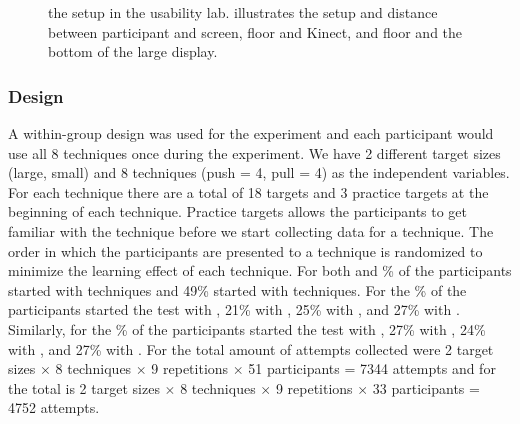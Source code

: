 \begin{figure}[H]
\caption{\protect{} the setup in the usability lab. \protect{} illustrates the setup and distance between participant and screen, floor and Kinect, and floor and the bottom of the large display.}
\end{figure}

\subsubsection{Design} \label{}
A within-group design was used for the experiment and each participant would use all 8 techniques once during the experiment.
We have 2 different target sizes (large, small) and 8 techniques (push = 4, pull = 4) as the independent variables.
For each technique there are a total of 18 targets and 3 practice targets at the beginning of each technique. 
Practice targets allows the participants to get familiar with the technique before we start collecting data for a technique.
The order in which the participants are presented to a technique is randomized to minimize the learning effect of each technique.
For both \target and \% of the participants started with \push techniques and 49\% started with \pull techniques.
For the \% of the participants started the test with \grab, 21\% with \swipe, 25\% with \throw, and 27\% with \tilt.
Similarly, for the \% of the participants started the test with \grab, 27\% with \swipe, 24\% with \throw, and 27\% with \tilt.
For \target the total amount of attempts collected were 2 target sizes $\times$ 8 techniques $\times$ 9 repetitions $\times$ 51 participants = 7344 attempts and for \accuracy the total is 2 target sizes $\times$ 8 techniques $\times$ 9 repetitions $\times$ 33 participants = 4752 attempts.

